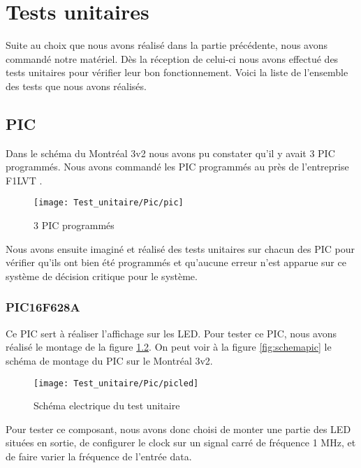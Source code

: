 \chapter{Tests unitaires}

Suite au choix que nous avons réalisé dans la partie précédente, nous avons commandé notre matériel. Dès la réception de celui-ci nous avons effectué des tests unitaires pour vérifier leur bon fonctionnement. Voici la liste de l'ensemble des tests que nous avons réalisés.




\section{PIC}
\label{sec:pic}

Dans le schéma du Montréal 3v2 nous avons pu constater qu'il y avait 3 PIC programmés. Nous avons commandé les PIC programmés au près de l'entreprise F1LVT \cite{montreal}.


\begin{figure}[!h]
  \centering
  \texttt{[image: Test\_unitaire/Pic/pic]}
  \caption{3 PIC programmés}
  \label{fig:pic}
\end{figure}

Nous avons ensuite imaginé et réalisé des tests unitaires sur chacun des PIC pour vérifier qu'ils ont bien été programmés et qu'aucune erreur n'est apparue sur ce système de décision critique pour le système.

\subsection{PIC16F628A}
\label{sec:picled}

Ce PIC sert à réaliser l'affichage sur les LED. Pour tester ce PIC, nous avons réalisé le montage de la figure \ref{fig:picled}. On peut voir à la figure \ref{fig:schemapic} le schéma de montage du PIC sur le Montréal 3v2.

\begin{figure}[!h]
  \centering
  \texttt{[image: Test\_unitaire/Pic/picled]}
  \caption{Schéma electrique du test unitaire}
  \label{fig:picled}
\end{figure}


Pour tester ce composant, nous avons donc choisi de monter une partie des LED situées en sortie, de configurer le \og clock\fg{} sur un signal carré de fréquence 1 MHz, et de faire varier la fréquence de l'entrée \og data\fg{}.

